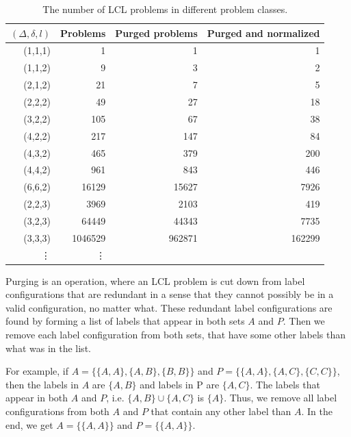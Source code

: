 \begin{table}[H]
  \centering
  \begin{tabular}{r|rrr}
    \toprule
    $(\Delta, \delta, l)$ & Problems & Purged problems & Purged and normalized\\
    \midrule
    (1,1,1)& 1 & 1 & 1 \\
    (1,1,2)& 9 & 3 & 2 \\
    (2,1,2)& 21 & 7 & 5 \\
    (2,2,2)& 49 & 27 & 18 \\
    (3,2,2)& 105 & 67 & 38 \\
    (4,2,2)& 217 & 147 & 84 \\
    (4,3,2)& 465 & 379 & 200 \\
    (4,4,2)& 961 & 843 & 446 \\
    (6,6,2)& 16129 & 15627 & 7926 \\
    (2,2,3)& 3969 & 2103 & 419 \\
    (3,2,3)& 64449 & 44343 & 7735 \\
    (3,3,3)& 1046529 & 962871 & 162299 \\
    \vdots & \vdots\\
    \bottomrule
  \end{tabular}
  \caption{%
    The number of LCL problems in different problem classes.
  }
  \label{tbl:lcl_problem_classes}
\end{table}

Purging is an operation, where an LCL problem is cut down from label configurations that are redundant in a sense that they cannot possibly be in a valid configuration, no matter what.
These redundant label configurations are found by forming a list of labels that appear in both sets $A$ and $P$.
Then we remove each label configuration from both sets, that have some other labels than what was in the list.

For example, if $A=\{\{A, A\}, \{A, B\}, \{B, B\}\}$ and $P=\{\{A, A\}, \{A, C\}, \{C, C\}\}$, then the labels in $A$ are $\{A, B\}$ and labels in P are $\{A, C\}$.
The labels that appear in both $A$ and $P$, i.e.  $\{A, B\} \cup \{A, C\} $ is $\{A\}$.
Thus, we remove all label configurations from both $A$ and $P$ that contain any other label than $A$.
In the end, we get $A=\{\{A, A\}\}$ and $P=\{\{A, A\}\}$.


